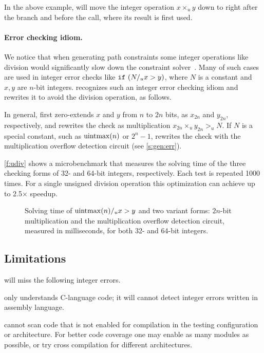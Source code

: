 In the above example, \sys will move the integer operation $x
\times_u y$ down to right after the  branch and before the
 call, where its result  is first used.

\paragraph{Error checking idiom.}

We notice that when generating path constraints some integer
operations like division would significantly slow down the constraint
solver~\cite{brummayer:perf}.  Many of such cases are used in integer
error checks like $\texttt{if}\ (N /_u x > y)$, where $N$ is a constant
and $x, y$ are $n$-bit integers.  \sys recognizes such an integer
error checking idiom and rewrites it to avoid the division operation,
as follows.

In general, \sys first zero-extends $x$ and $y$ from $n$ to $2n$
bits, as $x_{2n}$ and $y_{2n}$, respectively, and rewrites the check
as multiplication $x_{2n} \times_u y_{2n} >_u N$.  If $N$ is a
special constant, such as $\operatorname{uintmax}(n)$ or $2^n-1$, \sys rewrites
the check with the multiplication overflow detection circuit (see
\autoref{s:gen:err}).

\autoref{f:udiv} shows a microbenchmark that measures the solving
time of the three checking forms of 32- and 64-bit integers,
respectively.  Each test is repeated 1000 times.  For a single
unsigned division operation this optimization can achieve up to
2.5$\times$ speedup.

\begin{figure}
\centering

\caption{Solving time of $\operatorname{uintmax}(n) /_u x > y$ and two variant
forms: $2n$-bit multiplication and the multiplication overflow
detection circuit, measured in milliseconds, for both 32- and 64-bit
integers.}
\label{f:udiv}
\end{figure}

\subsection{Limitations}
\label{s:gen:limit}

\sys will miss the following integer errors.

\sys only understands C-language code; it will cannot detect integer
errors written in assembly language.

\sys cannot scan code that is not enabled for compilation in the
testing configuration or architecture.  For better code coverage
one may enable as many modules as possible, or try cross compilation
for different architectures.

